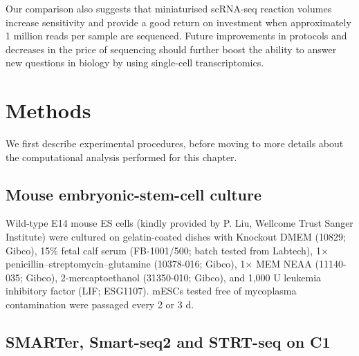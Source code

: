 Our comparison also suggests that miniaturised scRNA-seq reaction volumes increase sensitivity and provide a good return on investment when approximately 1 million reads per sample are sequenced. Future improvements in protocols and decreases in the price of sequencing should further boost the ability to answer new questions in biology by using single-cell transcriptomics.

\section{Methods}

We first describe experimental procedures, before moving to more details about the computational analysis performed for this chapter.

\subsection{Mouse embryonic-stem-cell culture}

\begin{sloppypar}
Wild-type E14 mouse ES cells (kindly provided by P. Liu, Wellcome Trust Sanger Institute) were cultured on gelatin-coated dishes with Knockout DMEM (10829; Gibco), 15\% fetal calf serum (FB-1001/500; batch tested from Labtech), 1× penicillin–streptomycin–glutamine (10378-016; Gibco), 1× MEM NEAA (11140-035; Gibco), 2-mercaptoethanol (31350-010; Gibco), and 1,000 U leukemia inhibitory factor (LIF; ESG1107). mESCs tested free of mycoplasma contamination were passaged every 2 or 3 d.
\end{sloppypar}

\subsection{SMARTer, Smart-seq2 and STRT-seq on C1}

